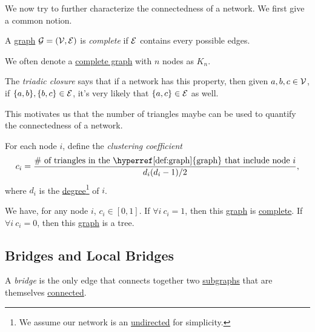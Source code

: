 We now try to further characterize the connectedness of a network. We first give a common notion.
\begin{definition}\label{def:complete-graph}
	A \hyperref[def:graph]{graph} \(\mathcal{\MakeUppercase{g}} = (\mathcal{\MakeUppercase{v}} , \mathcal{\MakeUppercase{e}} )\) is \emph{complete} if \(\mathcal{\MakeUppercase{e}} \)
	contains every possible edges.
\end{definition}

\begin{notation}
	We often denote a \hyperref[def:complete-graph]{complete graph} with \(n\) nodes as \(K_n\).
\end{notation}

\begin{eg}
	The \emph{triadic closure} says that if a network has this property, then given \(a, b, c\in \mathcal{\MakeUppercase{v}}\), if
	\(\{a, b\}, \{b, c\}\in \mathcal{\MakeUppercase{e}} \), it's very likely that \(\{a, c\} \in \mathcal{\MakeUppercase{e}} \) as well.
	\begin{figure}[H]
		\centering
		\label{fig:triadic-closure}
	\end{figure}
\end{eg}

This motivates us that the number of triangles maybe can be used to quantify the connectedness of a network.

\begin{definition}\label{def:clustering-coefficient}
	For each node \(i\), define the \emph{clustering coefficient}
	\[
		c_{i} = \dfrac{\#\text{ of triangles in the \hyperref[def:graph]{graph} that include node }i}{d_{i}(d_{i}-1) / 2},
	\]
	where \(d_i\) is the \hyperref[def:degree]{degree}\footnote{We assume our network is an \hyperref[def:undirected-graph]{undirected} for simplicity.} of \(i\).
\end{definition}

\begin{remark}
	We have, for any node \(i\), \(c_{i}\in \left[ 0, 1 \right].\) If \(\forall i\ c_{i} = 1\), then this \hyperref[def:graph]{graph} is \hyperref[def:complete-graph]{complete}.
	If \(\forall i\ c_{i} = 0\), then this \hyperref[def:graph]{graph} is a tree.
\end{remark}

\subsection{Bridges and Local Bridges}
\begin{definition}[Bridge]\label{def:bridge}
	A \emph{bridge} is the only edge that connects together two \hyperref[def:subgraph]{subgraphs} that are themselves \hyperref[def:connected]{connected}.
\end{definition}

